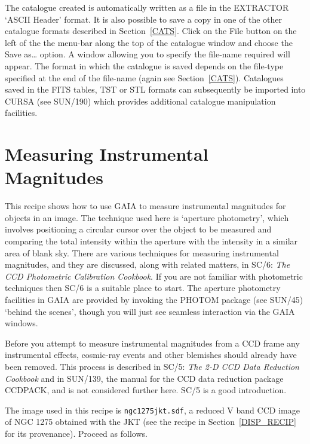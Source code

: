 \documentclass[twoside,11pt]{article}
\newcommand{\xref}[3]{#1}
\newcommand{\xlabel}[1]{}
\renewcommand{\_}{\texttt{\symbol{95}}}
\begin{document}
\begin{enumerate}
   The catalogue created is automatically written as a file in the
   EXTRACTOR `ASCII Header' format.  It is also possible to save a copy
   in one of the other catalogue formats described in Section~\ref{CATS}.
   Click on the {\sf File} button on the left of the the menu-bar along
   the top of the catalogue window and choose the {\sf Save as\ldots}
   option.  A window allowing you to specify the file-name required will
   appear.  The format in which the catalogue is saved depends on the
   file-type specified at the end of the file-name (again see
   Section~\ref{CATS}).  Catalogues saved in the FITS tables, TST or STL
   formats can subsequently be imported into CURSA (see
   \xref{SUN/190}{sun190}{}\cite{SUN190}) which provides additional
   catalogue manipulation facilities.

\end{enumerate}


\newpage
\section{\xlabel{PHOTOM_RECIP}\label{PHOTOM_RECIP}Measuring Instrumental
Magnitudes}

This recipe shows how to use GAIA to measure instrumental magnitudes for
objects in an image.  The technique used here is `aperture photometry',
which involves positioning a circular cursor over the object to be
measured and comparing the total intensity within the aperture with the
intensity in a similar area of blank sky.  There are various techniques
for measuring instrumental magnitudes, and they are discussed, along with
related matters, in \xref{SC/6: {\it The CCD Photometric Calibration
Cookbook}}{sc6}{}\/\cite{SC6}.  If you are not familiar with photometric
techniques then SC/6 is a suitable place to start.  The aperture photometry
facilities in GAIA are provided by invoking the PHOTOM package (see
\xref{SUN/45}{sun45}{}\cite{SUN45}) `behind the scenes', though you will
just see seamless interaction via the GAIA windows.

Before you attempt to measure instrumental magnitudes from a CCD frame
any instrumental effects, cosmic-ray events and other blemishes should
already have been removed.  This process is described in \xref{SC/5: {\it
The 2-D CCD Data Reduction Cookbook}}{sc5}{}\/\cite{SC5} and in
\xref{SUN/139}{sun139}{}\cite{SUN139}, the manual for the CCD data
reduction package CCDPACK, and is not considered further here.  SC/5 is
a good introduction.

The image used in this recipe is {\tt ngc1275jkt.sdf}, a reduced V band
CCD image of NGC 1275 obtained with the JKT (see the recipe in
Section~\ref{DISP_RECIP} for its provenance).  Proceed as follows.
\end{document}
